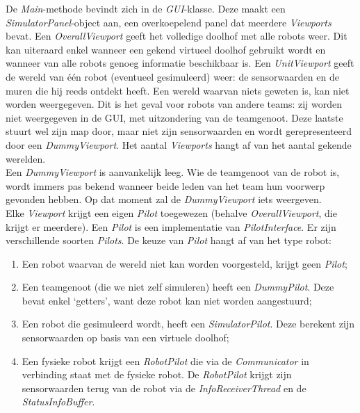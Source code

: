 \documentclass[eind]{penoverslag}
\begin{document}
De \textit{Main}-methode bevindt zich in de \textit{GUI}-klasse. Deze maakt een \textit{SimulatorPanel}-object aan, een overkoepelend panel dat meerdere \textit{Viewports} bevat. Een \textit{OverallViewport} geeft het volledige doolhof met alle robots weer. Dit kan uiteraard enkel wanneer een gekend virtueel doolhof gebruikt wordt en wanneer van alle robots genoeg informatie beschikbaar is. Een \textit{UnitViewport} geeft de wereld van \'e\'en robot (eventueel gesimuleerd) weer: de sensorwaarden en de muren die hij reeds ontdekt heeft. Een wereld waarvan niets geweten is, kan niet worden weergegeven. Dit is het geval voor robots van andere teams: zij worden niet weergegeven in de GUI, met uitzondering van de teamgenoot. Deze laatste stuurt wel zijn map door, maar niet zijn sensorwaarden en wordt gerepresenteerd door een \textit{DummyViewport}. Het aantal \textit{Viewports} hangt af van het aantal gekende werelden.\\

Een \textit{DummyViewport} is aanvankelijk leeg. Wie de teamgenoot van de robot is, wordt immers pas bekend wanneer beide leden van het team hun voorwerp gevonden hebben. Op dat moment zal de \textit{DummyViewport} iets weergeven.\\

Elke \textit{Viewport} krijgt een eigen \textit{Pilot} toegewezen (behalve \textit{OverallViewport}, die krijgt er meerdere). Een \textit{Pilot} is een implementatie van \textit{PilotInterface}. Er zijn verschillende soorten \textit{Pilots}. De keuze van \textit{Pilot} hangt af van het type robot:

\begin{enumerate}
	\item Een robot waarvan de wereld niet kan worden voorgesteld, krijgt geen \textit{Pilot};
	\item Een teamgenoot (die we niet zelf simuleren) heeft een \textit{DummyPilot}. Deze bevat enkel `getters', want deze robot kan niet worden aangestuurd;
	\item Een robot die gesimuleerd wordt, heeft een \textit{SimulatorPilot}. Deze berekent zijn sensorwaarden op basis van een virtuele doolhof;
	\item Een fysieke robot krijgt een \textit{RobotPilot} die via de \textit{Communicator} in verbinding staat met de fysieke robot. De \textit{RobotPilot} krijgt zijn sensorwaarden terug van de robot via de \textit{InfoReceiverThread} en de \textit{StatusInfoBuffer}.
\end{enumerate}
\end{document}
